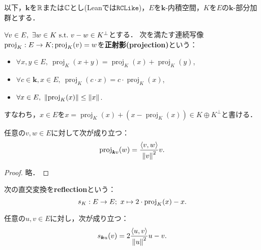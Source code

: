以下，$\bm{k}$を$\mathbb{R}$または$\mathbb{C}$とし(Leanでは$\mathtt{RCLike}$)，$E$を$\bm{k}$-内積空間，$K$を$E$の$\bm{k}$-部分加群とする．

\begin{defi}
  \label{defi:orthogonalProjection}
  \leanok
  $\forall v \in E,\ \exists w \in K \ \text{s.t.}\  v - w \in K^\perp$とする．
  次を満たす連続写像$\operatorname{proj}_K : E \rightarrow K; \operatorname{proj}_K(v) = w$を\textbf{正射影(projection)}という：
  \begin{itemize}
    \item $\forall x, y \in E,\ \operatorname{proj}_K(x + y) = \operatorname{proj}_K(x) + \operatorname{proj}_K(y)$,
    \item $\forall c \in \bm{k}, x \in E,\ \operatorname{proj}_K(c \cdot x) = c \cdot \operatorname{proj}_K(x)$,
    \item $\forall x \in E,\ \norm{\operatorname{proj}_K(x)} \le \norm{x}$.
  \end{itemize}
  すなわち，$x \in E$を$x = \operatorname{proj}_K(x) + (x - \operatorname{proj}_K(x)) \in K \oplus K^\perp$と書ける．
\end{defi}

\begin{thm}
  \label{thm:orthogonalProjection_singleton}
  \leanok
  任意の$v, w \in E$に対して次が成り立つ：
  \begin{equation}
    \operatorname{proj}_{\bm{k}v}(w) = \frac{\left\langle v, w \right\rangle}{\left\| v \right\|^2} v.
  \end{equation}
\end{thm}

\begin{proof}
  \leanok
  略．
\end{proof}

\begin{defi}
  \label{defi:reflection}
  \leanok
  次の直交変換を\textbf{reflection}という：
  \begin{equation}
    s_K : E \rightarrow E;\ x \mapsto 2 \cdot \operatorname{proj}_K(x) - x.
  \end{equation}
\end{defi}

\begin{thm}
  \label{thm:reflection_singleton_apply}
  \leanok
  任意の$u, v \in E$に対し，次が成り立つ：
  \begin{equation}
    s_{\bm{k}u}(v) = 2 \frac{\left\langle u, v \right\rangle}{\left\| u \right\|^2}u - v.
  \end{equation}
\end{thm}

